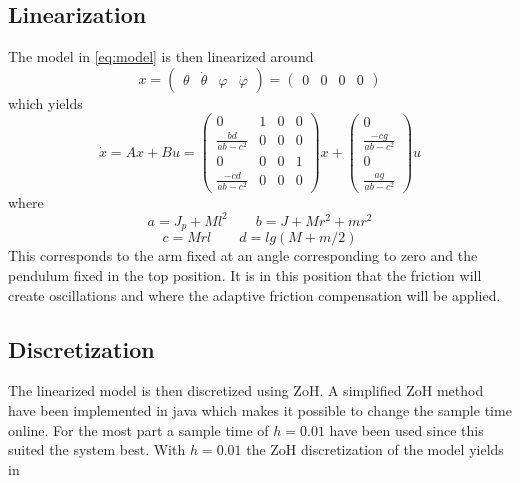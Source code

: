 \documentclass[10pt,a4paper]{article}
\begin{document}
\subsection{Linearization}
The model in \ref{eq:model} is then linearized around
\begin{equation}
x =
\begin{pmatrix}
\theta & \dot\theta & \varphi & \dot\varphi
\end{pmatrix} = 
\begin{pmatrix}
0 & 0 & 0 & 0
\end{pmatrix}
\end{equation}
which yields 
\begin{equation}
\dot{x} = Ax + Bu =
\begin{pmatrix}
0 & 1 & 0  & 0 \\
\frac{bd}{ab-c^2} & 0 & 0 & 0 \\
0 & 0 & 0 & 1 \\
\frac{-cd}{ab-c^2} & 0 & 0 & 0
\end{pmatrix}x
+
\begin{pmatrix}
0 \\
\frac{-cg}{ab-c^2} \\
0 \\
\frac{ag}{ab-c^2}
\end{pmatrix}u
\label{eq:linear}
\end{equation}
where 
$$ a = J_p + M l^2 \qquad b = J + M r^2 + m r^2 $$
$$ c = M r l  \qquad d = l g (M + m/2) $$
This corresponds to the arm fixed at an angle corresponding to zero and the pendulum fixed in the top position. It is in this position that the friction will create oscillations and where the adaptive friction compensation will be applied.
\subsection{Discretization}
The linearized model is then discretized using ZoH. A simplified ZoH method have been implemented in java which makes it possible to change the sample time online. For the most part a sample time of $h=0.01$ have been used since this suited the system best. With $h=0.01$ the ZoH discretization of the model yields in 
\end{document}

